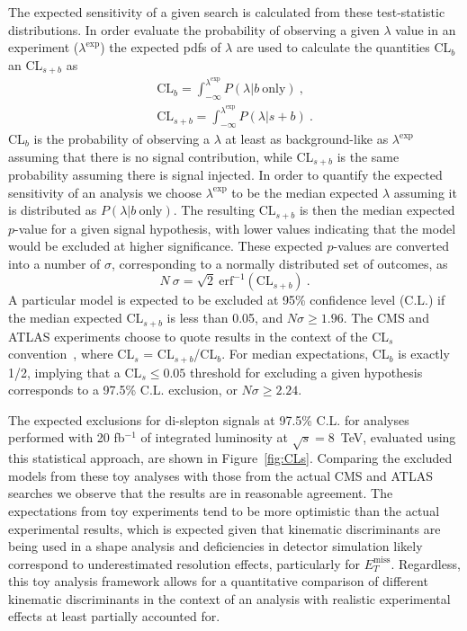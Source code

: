 The expected sensitivity of a given search is calculated from these test-statistic distributions. In order evaluate the probability of observing a given $\lambda$ value in an experiment ($\lambda^{\mathrm{exp}}$) the expected pdfs of $\lambda$ are used to calculate the quantities CL$_{b}$ an CL$_{s+b}$ as
\begin{eqnarray}
\mathrm{CL}_{b} = \int_{-\infty}^{\lambda^{\mathrm{exp}}} P(\lambda | b~\mathrm{only})~, \nonumber \\
\mathrm{CL}_{s+b} = \int_{-\infty}^{\lambda^{\mathrm{exp}}} P(\lambda | s+b)~.
\end{eqnarray}
CL$_{b}$ is the probability of observing a $\lambda$ at least as background-like as $\lambda^{\mathrm{exp}}$ assuming that there is no signal contribution, while CL$_{s+b}$ is the same probability assuming there is signal injected. In order to quantify the expected sensitivity of an analysis we choose $\lambda^{\mathrm{exp}}$ to be the median expected $\lambda$ assuming it is distributed as $P(\lambda | b~\mathrm{only})$. The resulting CL$_{s+b}$ is then the median expected $p$-value for a given signal hypothesis, with lower values indicating that the model would be excluded at higher significance. These expected $p$-values are converted into a number of $\sigma$, corresponding to a normally distributed set of outcomes, as
\begin{equation}
N~\sigma = \sqrt{2} ~\mathrm{erf}^{-1} (\mathrm{CL}_{s+b})~.
\end{equation}
A particular model is expected to be excluded at 95\% confidence level (C.L.) if the median expected CL$_{s+b}$ is less than 0.05, and $N \sigma \ge 1.96$. The CMS and ATLAS experiments choose to quote results in the context of the CL$_{s}$ convention~\cite{Junk:1999kv,Read:2002hq}, where CL$_{s}$ = CL$_{s+b}$/CL$_b$. For median expectations, CL$_b$ is exactly 1/2, implying that a CL$_{s} \le 0.05$ threshold for excluding a given hypothesis corresponds to a 97.5\% C.L. exclusion, or $N \sigma \ge 2.24$. 

The expected exclusions for di-slepton signals at 97.5\% C.L. for analyses performed with 20 fb$^{-1}$ of integrated luminosity at $\sqrt{s} = 8$~TeV, evaluated using this statistical approach, are shown in Figure~\ref{fig:CLs}. Comparing the excluded models from these toy analyses with those from the actual CMS \cite{CMS-PAS-SUS-13-006} and ATLAS \cite{ATLAS-CONF-2013-049} searches we observe that the results are in reasonable agreement. The expectations from toy experiments tend to be more optimistic than the actual experimental results, which is expected given that kinematic discriminants are being used in a shape analysis and deficiencies in detector simulation likely correspond to underestimated resolution effects, particularly for $E_{T}^\text{miss}$. Regardless, this toy analysis framework allows for a quantitative comparison of different kinematic discriminants in the context of an analysis with realistic experimental effects at least partially accounted for.

